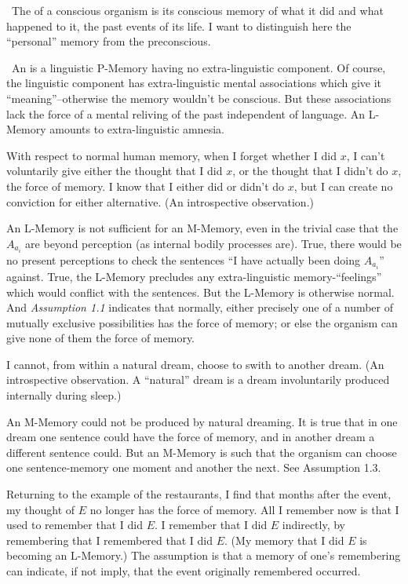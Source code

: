 \begin{hangers}
\ The  of a conscious organism is its conscious 
memory of what it did and what happened to it, the past events of its life. I 
want to distinguish here the \enquote{personal} memory from the preconscious. 

\ An  is a linguistic P-Memory having no 
extra-linguistic component. Of course, the linguistic component has 
extra-linguistic mental associations which give it \enquote{meaning}--otherwise the 
memory wouldn't be conscious. But these associations lack the force of a 
mental reliving of the past independent of language. An L-Memory amounts 
to extra-linguistic amnesia. 

 With respect to normal human memory, when I forget 
whether I did $x$, I can't voluntarily give either the thought that I did $x$, or 
the thought that I didn't do $x$, the force of memory. I know that I either did 
or didn't do $x$, but I can create no conviction for either alternative. (An 
introspective observation.) 

 An L-Memory is not sufficient for an M-Memory, even 
in the trivial case that the $A_{a_i}$ are beyond perception (as internal bodily 
processes are). True, there would be no present perceptions to check the 
sentences \enquote{I have actually been doing $A_{a_i}$} against. True, the L-Memory 
precludes any extra-linguistic memory-\enquote{feelings} which would conflict with 
the sentences. But the L-Memory is otherwise normal. And \textit{Assumption 1.1}
indicates that normally, either precisely one of a number of mutually 
exclusive possibilities has the force of memory; or else the organism can give 
none of them the force of memory. 

 I cannot, from within a natural dream, choose to swith 
to another dream. (An introspective observation. A \enquote{natural} dream is a 
dream involuntarily produced internally during sleep.) 

 An M-Memory could not be produced by natural 
dreaming. It is true that in one dream one sentence could have the force of 
memory, and in another dream a different sentence could. But an M-Memory 
is such that the organism can choose one sentence-memory one moment and 
another the next. See Assumption 1.3. 

 Returning to the example of the restaurants, I find 
that months after the event, my thought of $E$ no longer has the force of 
memory. All I remember now is that I used to remember that I did $E$. I 
remember that I did $E$ indirectly, by remembering that I remembered that I 
did $E$. (My memory that I did $E$ is becoming an L-Memory.) The assumption 
is that a memory of one's remembering can indicate, if not imply, that the 
event originally remembered occurred. 


\end{hangers}
